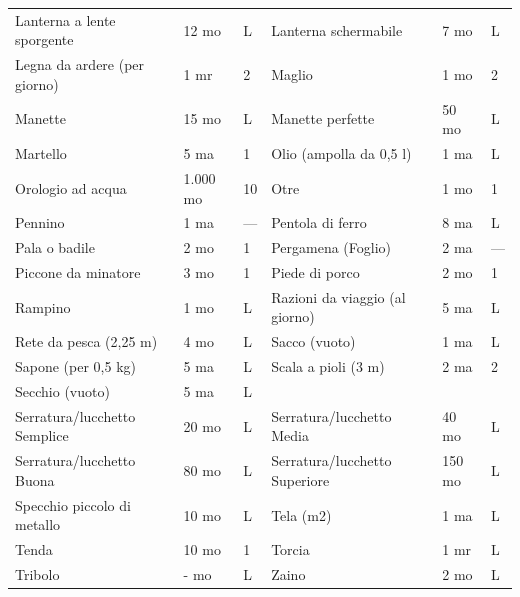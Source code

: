 \documentclass[a4paper,11pt,twoside,openany]{book}
\begin{document}
\begin{tabularx}{1\textwidth}{XllXll}
	Lanterna a lente sporgente  & 12 mo    & L   & Lanterna schermabile& 7 mo& L   \\
	Legna da ardere (per giorno)& 1 mr& 2   & Maglio& 1 mo& 2   \\
	Manette & 15 mo    & L   & Manette perfette    & 50 mo& L   \\
	Martello& 5 ma& 1   & Olio (ampolla da 0,5 l)& 1 ma& L   \\
	Orologio ad acqua   & 1.000 mo & 10  & Otre  & 1 mo& 1   \\
	Pennino & 1 ma& —   & Pentola di ferro    & 8 ma& L   \\
	Pala o badile & 2 mo& 1   & Pergamena (Foglio)  & 2 ma& —   \\
	Piccone da minatore & 3 mo& 1   & Piede di porco& 2 mo& 1   \\
	Rampino & 1 mo& L   & Razioni da viaggio (al giorno)    & 5 ma& L   \\
	Rete da pesca (2,25 m)& 4 mo& L   & Sacco (vuoto) & 1 ma& L   \\
	Sapone (per 0,5 kg) & 5 ma& L   & Scala a pioli (3 m) & 2 ma& 2   \\
	Secchio (vuoto)& 5 ma& L   & \\
	Serratura/lucchetto Semplice& 20 mo    & L   & Serratura/lucchetto Media & 40 mo& L   \\
	Serratura/lucchetto Buona & 80 mo    & L   & Serratura/lucchetto Superiore& 150 mo    & L   \\
	Specchio piccolo di metallo & 10 mo    & L   & Tela (m2)& 1 ma& L   \\
	Tenda & 10 mo    & 1   & Torcia& 1 mr& L   \\
	Tribolo & - mo& L   & Zaino & 2 mo& L   \\
\end{tabularx}
\bigskip
\end{document}
